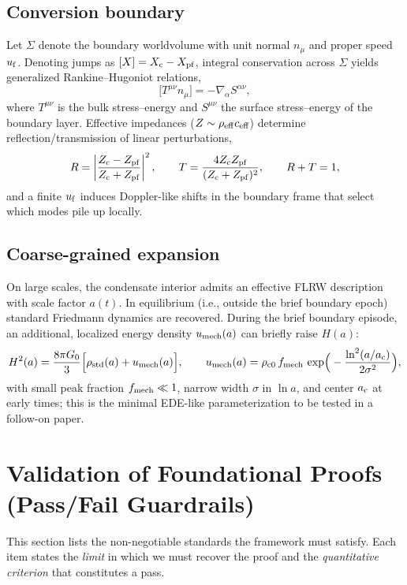 \documentclass[11pt,a4paper]{article}
\newcommand{\ac}{a_{\rm c}}
\begin{document}
\subsection{Conversion boundary}
Let $\Sigma$ denote the boundary worldvolume with unit normal $n_\mu$ and proper speed $u_{\rm f}$. Denoting jumps as $[X]=X_{\rm c}-X_{\rm pf}$, integral conservation across $\Sigma$ yields generalized Rankine–Hugoniot relations,
\begin{equation}
\big[T^{\mu\nu} n_\mu\big] = - \nabla_\alpha S^{\alpha\nu},
\end{equation}
where $T^{\mu\nu}$ is the bulk stress–energy and $S^{\mu\nu}$ the surface stress–energy of the boundary layer. Effective impedances ($Z\sim \rho_{\rm eff} c_{\rm eff}$) determine reflection/transmission of linear perturbations,
\begin{equation}
R=\left|\frac{Z_{\rm c}-Z_{\rm pf}}{Z_{\rm c}+Z_{\rm pf}}\right|^{2},\qquad
T=\frac{4 Z_{\rm c} Z_{\rm pf}}{(Z_{\rm c}+Z_{\rm pf})^{2}},\qquad R+T=1,
\end{equation}
and a finite $u_{\rm f}$ induces Doppler-like shifts in the boundary frame that select which modes pile up locally.

\subsection{Coarse-grained expansion}
On large scales, the condensate interior admits an effective FLRW description with scale factor $a(t)$. In equilibrium (i.e., outside the brief boundary epoch) standard Friedmann dynamics are recovered. During the brief boundary episode, an additional, localized energy density $u_{\rm mech}(a)$ can briefly raise $H(a)$:
\begin{equation}
H^2(a)=\frac{8\pi G_0}{3}\Big[\rho_{\rm std}(a)+u_{\rm mech}(a)\Big],\qquad
u_{\rm mech}(a)=\rho_{\rm c0}\,f_{\rm mech}\,\exp\!\Big(-\frac{\ln^2(a/\ac)}{2\sigma^2}\Big),
\end{equation}
with small peak fraction $f_{\rm mech}\ll 1$, narrow width $\sigma$ in $\ln a$, and center $\ac$ at early times; this is the minimal EDE-like parameterization to be tested in a follow-on paper.

\section{Validation of Foundational Proofs (Pass/Fail Guardrails)}
This section lists the non-negotiable standards the framework must satisfy. Each item states the \emph{limit} in which we must recover the proof and the \emph{quantitative criterion} that constitutes a pass.
\end{document}
